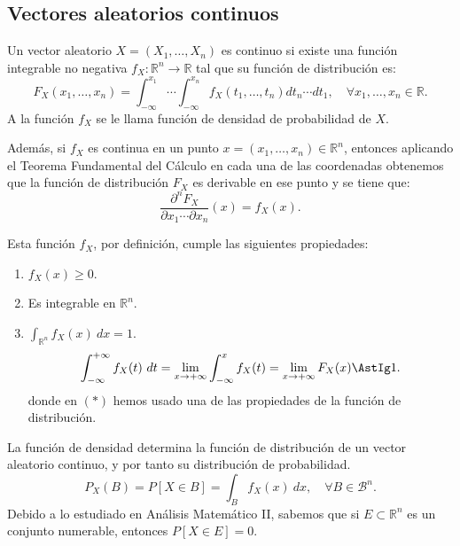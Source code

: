 \subsection{Vectores aleatorios continuos}

\begin{definicion}
    Un vector aleatorio $X=(X_1, \ldots, X_n)$ es continuo si existe una función integrable no negativa $f_X:\mathbb{R}^n\to \mathbb{R}$ tal que su función de distribución es:
    \begin{equation*}
        F_X(x_1, \ldots, x_n) = \int_{-\infty}^{x_1}\cdots\int_{-\infty}^{x_n} f_X(t_1, \ldots, t_n) d t_n \cdots dt_1,
        \quad \forall x_1, \ldots, x_n \in \mathbb{R}.
    \end{equation*}
    A la función $f_X$ se le llama función de densidad de probabilidad de $X$.
\end{definicion}

Además, si $f_X$ es continua en un punto $x=(x_1, \ldots, x_n)\in \mathbb{R}^n$, entonces aplicando el Teorema Fundamental del Cálculo en cada una de las coordenadas obtenemos que la función de distribución $F_X$ es derivable en ese punto y se tiene que:
\begin{equation*}
    \frac{\partial^n F_X}{\partial x_1\cdots \partial x_n}(x) = f_X(x).
\end{equation*}

Esta función $f_X$, por definición, cumple las siguientes propiedades:
\begin{enumerate}
    \item $f_X(x)\geq 0$.
    \item Es integrable en $\mathbb{R}^n$.
    \item $\int_{\mathbb{R}^n} f_X(x)~d x = 1$.
    \begin{equation*}
        \int_{-\infty}^{+\infty}f_X(t)~d t =
        \lim_{x\to +\infty} \int_{-\infty}^{x} f_X(t) = \lim_{x\to +\infty} F_X(x) \AstIg 1.
    \end{equation*}
    donde en $(\ast)$ hemos usado una de las propiedades de la función de distribución.
\end{enumerate}

La función de densidad determina la función de distribución de un vector aleatorio continuo, y por tanto su distribución de probabilidad.
\begin{equation*}
    P_X(B) = P[X\in B]= \int_B f_X(x)~d x, \quad \forall B\in \mathcal{B}^n.
\end{equation*}
Debido a lo estudiado en Análisis Matemático II, sabemos que si $E\subset \mathbb{R}^n$ es un conjunto numerable, entonces $P[X\in E] = 0$.\\


